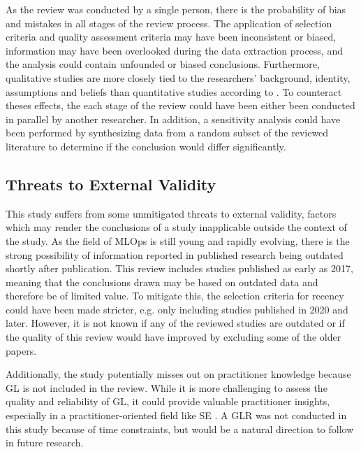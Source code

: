 As the review was conducted by a single person, there is the probability of bias and mistakes in all stages of the review process.
The application of selection criteria and quality assessment criteria may have been inconsistent or biased, information may have been overlooked during the data extraction process, and the analysis could contain unfounded or biased conclusions.
Furthermore, qualitative studies are more closely tied to the researchers' background, identity, assumptions and beliefs than quantitative studies according to \textcite{Oates2005}.
To counteract theses effects, the each stage of the review could have been either been conducted in parallel by another researcher.
In addition, a sensitivity analysis could have been performed by synthesizing data from a random subset of the reviewed literature to determine if the conclusion would differ significantly.

\subsection{Threats to External Validity}
This study suffers from some unmitigated threats to external validity, factors which may render the conclusions of a study inapplicable outside the context of the study.
As the field of MLOps is still young and rapidly evolving, there is the strong possibility of information reported in published research being outdated shortly after publication.
This review includes studies published as early as 2017, meaning that the conclusions drawn may be based on outdated data and therefore be of limited value.
To mitigate this, the selection criteria for recency could have been made stricter, e.g. only including studies published in 2020 and later.
However, it is not known if any of the reviewed studies are outdated or if the quality of this review would have improved by excluding some of the older papers.

Additionally, the study potentially misses out on practitioner knowledge because GL is not included in the review.
While it is more challenging to assess the quality and reliability of GL, it could provide valuable practitioner insights, especially in a practitioner-oriented field like SE \cite{Garousi2016}.
A GLR was not conducted in this study because of time constraints, but would be a natural direction to follow in future research.

